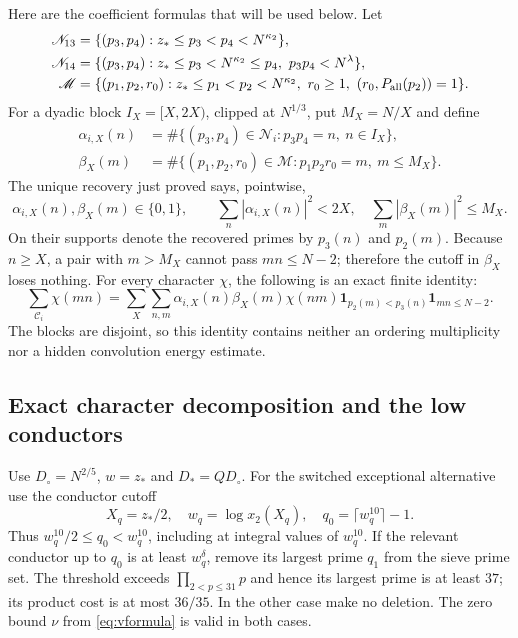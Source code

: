 \documentclass[11pt]{article}
\theoremstyle{definition}
\newcommand{\ind}{\mathbf 1}
\begin{document}
Here are the coefficient formulas that will be used below.  Let
\begin{align*}
 \mathscr N_{13}&=\{(p_3,p_4):z_*\le p_3<p_4<N^{\kappa_2}\},\\
 \mathscr N_{14}&=\{(p_3,p_4):z_*\le p_3<N^{\kappa_2}\le p_4,
                                  \ p_3p_4<N^\lambda\},\\
 \mathscr M&=\{(p_1,p_2,r_0):z_*\le p_1<p_2<N^{\kappa_2},\ r_0\ge1,
                         \ (r_0,P_{\rm all}(p_2))=1\}.
\end{align*}
For a dyadic block $I_X=[X,2X)$, clipped at $N^{1/3}$, put
$M_X=N/X$ and define
\begin{align*}
 \alpha_{i,X}(n)&=
  \#\{(p_3,p_4)\in\mathscr N_i:p_3p_4=n,\ n\in I_X\},\\
 \beta_X(m)&=
  \#\{(p_1,p_2,r_0)\in\mathscr M:p_1p_2r_0=m,\ m\le M_X\}.
\end{align*}
The unique recovery just proved says, pointwise,
\[
 \alpha_{i,X}(n),\beta_X(m)\in\{0,1\},\qquad
 \sum_n|\alpha_{i,X}(n)|^2<2X,\quad
 \sum_m|\beta_X(m)|^2\le M_X.
\]
On their supports denote the recovered primes by $p_3(n)$ and $p_2(m)$.
Because $n\ge X$, a pair with $m>M_X$ cannot pass $mn\le N-2$;
therefore the cutoff in $\beta_X$ loses nothing.  For every character
$\chi$, the following is an exact finite identity:
\begin{equation}\label{eq:switch-source-identity}
 \sum_{\mathcal C_i}\chi(mn)
 =\sum_X\sum_{n,m}\alpha_{i,X}(n)\beta_X(m)\chi(nm)
   \ind_{p_2(m)<p_3(n)}\ind_{mn\le N-2}.
\end{equation}
The blocks are disjoint, so this identity contains neither an ordering
multiplicity nor a hidden convolution energy estimate.

\subsection{Exact character decomposition and the low conductors}

Use $D_\circ=N^{2/5}$, $w=z_*$ and $D_*=QD_\circ$.
For the switched exceptional alternative use the conductor cutoff
\[
 X_q=z_*/2,\quad w_q=\log x_2(X_q),\quad
 q_0=\lceil w_q^{10}\rceil-1.
\]
Thus $w_q^{10}/2\le q_0<w_q^{10}$, including at integral values
of $w_q^{10}$.  If the relevant conductor up to $q_0$ is at least
$w_q^\delta$, remove its largest prime $q_1$ from the sieve prime set.
The threshold exceeds $\prod_{2<p\le31}p$ and hence its largest prime
is at least $37$; its product cost is at most $36/35$.  In the other
case make no deletion.
The zero bound $\nu$ from \eqref{eq:vformula} is valid in both cases.
\end{document}
